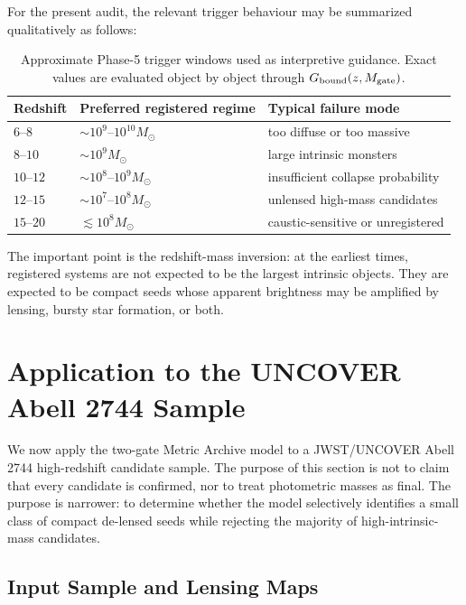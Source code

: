 \documentclass[11pt,a4paper]{article}
\newcommand{\Msun}{M_\odot}
\begin{document}
For the present audit, the relevant trigger behaviour may be summarized qualitatively as follows:
\begin{table}[H]
\centering
\caption{Approximate Phase-5 trigger windows used as interpretive guidance. Exact values are evaluated object by object through $G_{\rm bound}(z,M_{\rm gate})$.}
\begin{tabular}{lll}
\toprule
Redshift & Preferred registered regime & Typical failure mode \\
\midrule
$6$--$8$ & $\sim10^9$--$10^{10}\Msun$ & too diffuse or too massive \\
$8$--$10$ & $\sim10^9\Msun$ & large intrinsic monsters \\
$10$--$12$ & $\sim10^8$--$10^9\Msun$ & insufficient collapse probability \\
$12$--$15$ & $\sim10^7$--$10^8\Msun$ & unlensed high-mass candidates \\
$15$--$20$ & $\lesssim10^8\Msun$ & caustic-sensitive or unregistered \\
\bottomrule
\end{tabular}
\end{table}

The important point is the redshift-mass inversion: at the earliest times, registered systems are not expected to be the largest intrinsic objects. They are expected to be compact seeds whose apparent brightness may be amplified by lensing, bursty star formation, or both.

\section{Application to the UNCOVER Abell 2744 Sample}

We now apply the two-gate Metric Archive model to a JWST/UNCOVER Abell 2744 high-redshift candidate sample. The purpose of this section is not to claim that every candidate is confirmed, nor to treat photometric masses as final. The purpose is narrower: to determine whether the model selectively identifies a small class of compact de-lensed seeds while rejecting the majority of high-intrinsic-mass candidates.

\subsection{Input Sample and Lensing Maps}
\end{document}
